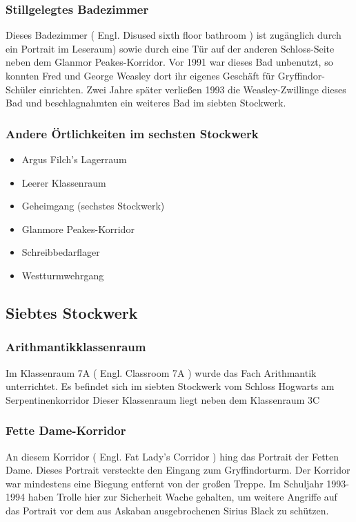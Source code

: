 \documentclass[a4paper, 10pt]{article}
\begin{document}
\subsubsection*{\large Stillgelegtes Badezimmer}
Dieses Badezimmer (  Engl.  Disused sixth floor bathroom ) ist zugänglich durch ein Portrait im Leseraum) sowie durch eine Tür auf der anderen Schloss-Seite neben dem Glanmor Peakes-Korridor. Vor 1991 war dieses Bad unbenutzt, so konnten Fred und George Weasley dort ihr eigenes Geschäft für Gryffindor-Schüler einrichten. Zwei Jahre später verließen 1993 die Weasley-Zwillinge dieses Bad und beschlagnahmten ein weiteres Bad im siebten Stockwerk.
\subsubsection*{\large Andere Örtlichkeiten im sechsten Stockwerk}
\vspace{10pt}
\begin{itemize}
    \item Argus Filch's Lagerraum
    \item Leerer Klassenraum
    \item Geheimgang (sechstes Stockwerk)
    \item Glanmore Peakes-Korridor
    \item Schreibbedarflager
    \item Westturmwehrgang
\end{itemize}
\subsection*{\Large Siebtes Stockwerk}
\subsubsection*{\large Arithmantikklassenraum}
Im Klassenraum 7A (  Engl.  Classroom 7A ) wurde das Fach Arithmantik unterrichtet. Es befindet sich im siebten Stockwerk vom Schloss Hogwarts am Serpentinenkorridor Dieser Klassenraum liegt neben dem Klassenraum 3C
\subsubsection*{\large Fette Dame-Korridor}
An diesem Korridor (  Engl.  Fat Lady's Corridor ) hing das Portrait der Fetten Dame. Dieses Portrait versteckte den Eingang zum Gryffindorturm. Der Korridor war mindestens eine Biegung entfernt von der großen Treppe. Im Schuljahr 1993-1994 haben Trolle hier zur Sicherheit Wache gehalten, um weitere Angriffe auf das Portrait vor dem aus Askaban ausgebrochenen Sirius Black zu schützen.
\end{document}

